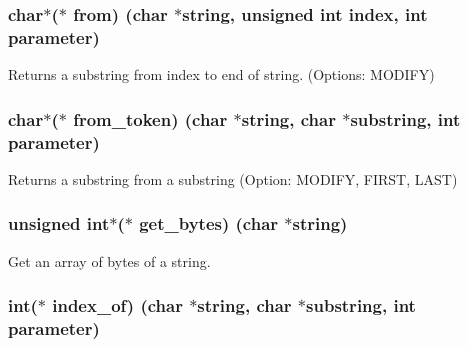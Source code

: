 \subsubsection[{from}]{\setlength{\rightskip}{0pt plus 5cm}char$\ast$($\ast$ from) (char $\ast$string, unsigned int index, int parameter)}\label{struct_string___utils_a65e07feab3b61c0bb51c9b15dcb00c22}


Returns a substring from index to end of string. (Options\+: M\+O\+D\+I\+F\+Y) 

\hypertarget{struct_string___utils_af7187b0f8160f90ac71ecfab71b60ff6}{}
\subsubsection[{from\+\_\+token}]{\setlength{\rightskip}{0pt plus 5cm}char$\ast$($\ast$ from\+\_\+token) (char $\ast$string, char $\ast${\bf substring}, int parameter)}\label{struct_string___utils_af7187b0f8160f90ac71ecfab71b60ff6}


Returns a substring from a substring (Option\+: M\+O\+D\+I\+F\+Y, F\+I\+R\+S\+T, L\+A\+S\+T) 

\hypertarget{struct_string___utils_acb4ba735906a187651cb53538f6ec070}{}
\subsubsection[{get\+\_\+bytes}]{\setlength{\rightskip}{0pt plus 5cm}unsigned int$\ast$($\ast$ get\+\_\+bytes) (char $\ast$string)}\label{struct_string___utils_acb4ba735906a187651cb53538f6ec070}


Get an array of bytes of a string. 

\hypertarget{struct_string___utils_a4c735a3556a0e63300f6c23e36668d08}{}
\subsubsection[{index\+\_\+of}]{\setlength{\rightskip}{0pt plus 5cm}int($\ast$ index\+\_\+of) (char $\ast$string, char $\ast${\bf substring}, int parameter)}\label{struct_string___utils_a4c735a3556a0e63300f6c23e36668d08}


